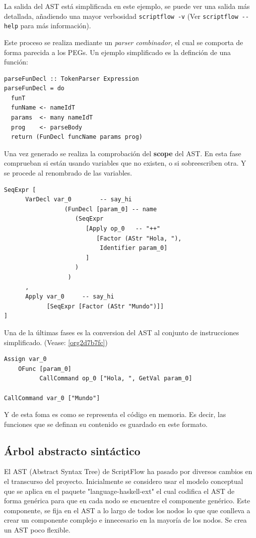 \documentclass[11pt]{article}
\begin{document}
La salida del AST está simplificada en este ejemplo, se puede ver una salida más detallada,
añadiendo una mayor verbosidad \texttt{scriptflow -v} (Ver \texttt{scriptflow -{}-help} para más información).

Este proceso se realiza mediante un \emph{parser combinador}, el cual se comporta de
forma parecida a los PEGs. Un ejemplo simplificado es la definción de
una función:

\begin{verbatim}
parseFunDecl :: TokenParser Expression
parseFunDecl = do
  funT
  funName <- nameIdT
  params  <- many nameIdT
  prog    <- parseBody
  return (FunDecl funcName params prog)
\end{verbatim}

Una vez generado se realiza la comprobación del \textbf{scope} del AST. En esta fase
comprueban si están usando variables que no existen, o si sobreescriben
otra. Y se procede al renombrado de las variables.

\begin{verbatim}
SeqExpr [
      VarDecl var_0        -- say_hi
                 (FunDecl [param_0] -- name
                    (SeqExpr
                       [Apply op_0   -- "++"
                          [Factor (AStr "Hola, "),
                           Identifier param_0]
                       ]
                    )
                  )
      ,
      Apply var_0     -- say_hi
            [SeqExpr [Factor (AStr "Mundo")]]
]
\end{verbatim}

Una de la últimas fases es la conversion del AST al conjunto de
instrucciones simplificado. (Vease: \ref{org2d7b7fc})

\begin{verbatim}
Assign var_0
    OFunc [param_0]
          CallCommand op_0 ["Hola, ", GetVal param_0]

CallCommand var_0 ["Mundo"]
\end{verbatim}

Y de esta foma es como se representa el código en memoria. Es decir, las
funciones que se definan su contenido es guardado en este formato.

\subsection{Árbol abstracto sintáctico}
\label{sec:org8dbc216}

El AST (Abstract Syntax Tree) de ScriptFlow ha pasado por diversos cambios en el transcurso del proyecto. Inicialmente
se considero usar el modelo conceptual que se aplica en el paquete "language-haskell-ext" el cual codifica el AST de forma genérica
para que en cada nodo se encuentre el componente genérico. Este componente, se fija en el AST a lo largo de todos los nodos lo que
que conlleva a crear un componente complejo e innecesario en la mayoría de los nodos. Se crea un AST poco flexible.
\end{document}
